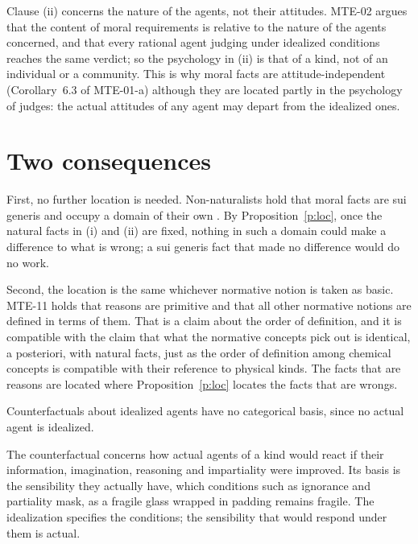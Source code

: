 \documentclass{situationist-preprint}
\begin{document}
Clause (ii) concerns the nature of the agents, not their attitudes. MTE-02 argues that the content of moral requirements is relative to the nature of the agents concerned, and that every rational agent judging under idealized conditions reaches the same verdict; so the psychology in (ii) is that of a kind, not of an individual or a community. This is why moral facts are attitude-independent (Corollary~6.3 of MTE-01-a) although they are located partly in the psychology of judges: the actual attitudes of any agent may depart from the idealized ones.

\section{Two consequences}\label{s:cons}

First, no further location is needed. Non-naturalists hold that moral facts are sui generis and occupy a domain of their own \citep{ShaferLandau2003, Enoch2011}. By Proposition~\ref{p:loc}, once the natural facts in (i) and (ii) are fixed, nothing in such a domain could make a difference to what is wrong; a sui generis fact that made no difference would do no work.

Second, the location is the same whichever normative notion is taken as basic. MTE-11 holds that reasons are primitive and that all other normative notions are defined in terms of them. That is a claim about the order of definition, and it is compatible with the claim that what the normative concepts pick out is identical, a posteriori, with natural facts, just as the order of definition among chemical concepts is compatible with their reference to physical kinds. The facts that are reasons are located where Proposition~\ref{p:loc} locates the facts that are wrongs.

\begin{objection}
Counterfactuals about idealized agents have no categorical basis, since no actual agent is idealized.
\end{objection}

\begin{reply}
The counterfactual concerns how actual agents of a kind would react if their information, imagination, reasoning and impartiality were improved. Its basis is the sensibility they actually have, which conditions such as ignorance and partiality mask, as a fragile glass wrapped in padding remains fragile. The idealization specifies the conditions; the sensibility that would respond under them is actual.
\end{reply}
\end{document}

